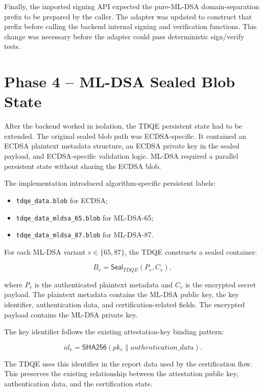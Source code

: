 Finally, the imported signing API expected the pure-ML-DSA domain-separation
prefix to be prepared by the caller. The adapter was updated to construct that
prefix before calling the backend internal signing and verification functions.
This change was necessary before the adapter could pass deterministic
sign/verify tests.

\section{Phase 4 -- ML-DSA Sealed Blob State}

After the backend worked in isolation, the TDQE persistent state had to be
extended. The original sealed blob path was ECDSA-specific. It contained an
ECDSA plaintext metadata structure, an ECDSA private key in the sealed payload,
and ECDSA-specific validation logic. ML-DSA required a parallel persistent
state without sharing the ECDSA blob.

The implementation introduced algorithm-specific persistent labels:

\begin{itemize}
  \item \texttt{tdqe\_data.blob} for ECDSA;
  \item \texttt{tdqe\_data\_mldsa\_65.blob} for ML-DSA-65;
  \item \texttt{tdqe\_data\_mldsa\_87.blob} for ML-DSA-87.
\end{itemize}

For each ML-DSA variant \(v \in \{65,87\}\), the TDQE constructs a sealed
container:

\begin{equation}
  B_v = \mathsf{Seal}_{TDQE}(P_v, C_v),
\end{equation}

where \(P_v\) is the authenticated plaintext metadata and \(C_v\) is the
encrypted secret payload. The plaintext metadata contains the ML-DSA public
key, the key identifier, authentication data, and certification-related fields.
The encrypted payload contains the ML-DSA private key.

The key identifier follows the existing attestation-key binding pattern:

\begin{equation}
  id_v = \mathsf{SHA256}(pk_v \parallel authentication\_data).
\end{equation}

The TDQE uses this identifier in the report data used by the certification
flow. This preserves the existing relationship between the attestation public
key, authentication data, and the certification state.

